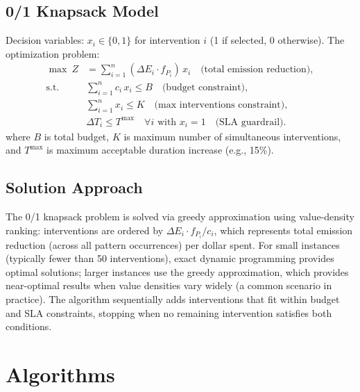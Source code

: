 \documentclass[conference]{IEEEtran}
\begin{document}
\subsection{0/1 Knapsack Model}
Decision variables: $x_i\in\{0,1\}$ for intervention $i$ (1 if selected, 0 otherwise). The optimization problem:
\begin{align}
\max\ Z &= \sum_{i=1}^{n} (\Delta E_i \cdot f_{P_i}) \, x_i \quad \text{(total emission reduction)},\\
\text{s.t.}\quad &\sum_{i=1}^{n} c_i \, x_i \le B \quad \text{(budget constraint)},\\
&\sum_{i=1}^{n} x_i \le K \quad \text{(max interventions constraint)},\\
&\Delta T_i \le T^{\max} \quad \forall i \text{ with } x_i=1 \quad \text{(SLA guardrail)}.
\end{align}
where $B$ is total budget, $K$ is maximum number of simultaneous interventions, and $T^{\max}$ is maximum acceptable duration increase (e.g., 15\%).

\subsection{Solution Approach}
The 0/1 knapsack problem is solved via greedy approximation using value-density ranking: interventions are ordered by $\Delta E_i \cdot f_{P_i} / c_i$, which represents total emission reduction (across all pattern occurrences) per dollar spent. For small instances (typically fewer than 50 interventions), exact dynamic programming provides optimal solutions; larger instances use the greedy approximation, which provides near-optimal results when value densities vary widely (a common scenario in practice). The algorithm sequentially adds interventions that fit within budget and SLA constraints, stopping when no remaining intervention satisfies both conditions.

\section{Algorithms}
\end{document}
